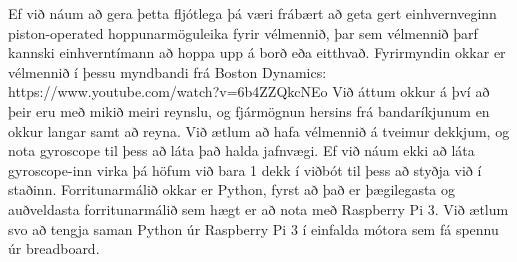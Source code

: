 Ef við náum að gera þetta fljótlega þá væri frábært að geta gert einhvernveginn piston-operated hoppunarmöguleika fyrir vélmennið, þar sem vélmennið þarf kannski einhverntímann að hoppa upp á borð eða eitthvað. 
Fyrirmyndin okkar er vélmennið í þessu myndbandi frá Boston Dynamics: https://www.youtube.com/watch?v=6b4ZZQkcNEo Við áttum okkur á því að þeir eru með mikið meiri reynslu, og fjármögnun hersins frá bandaríkjunum en okkur langar samt að reyna. Við ætlum að hafa vélmennið á tveimur dekkjum, og nota gyroscope til þess að láta það halda jafnvægi. Ef við náum ekki að láta gyroscope-inn virka þá höfum við bara 1 dekk í viðbót til þess að styðja við í staðinn. 
Forritunarmálið okkar er Python, fyrst að það er þægilegasta og auðveldasta forritunarmálið sem hægt er að nota með Raspberry Pi 3. Við ætlum svo að tengja saman Python úr Raspberry Pi 3 í einfalda mótora sem fá spennu úr breadboard.